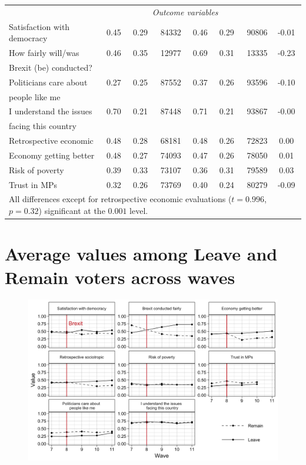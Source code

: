\documentclass[12pt, letter]{article}
\begin{document}
\begin{center}
\begin{longtable}{lrrrrrrc}
  & \multicolumn{6}{c}{\textit{Outcome variables}} \\
  Satisfaction with democracy & 0.45 & 0.29 & 84332 & 0.46 & 0.29 & 90806 & -0.01 \\  
  How fairly will/was  & 0.46 & 0.35 & 12977 & 0.69 & 0.31 & 13335 & -0.23 \\ 
  Brexit (be) conducted? & & & & & & &\\
  Politicians care about & 0.27 & 0.25 & 87552 & 0.37 & 0.26 & 93596 & -0.10 \\ 
  people like me & & & & & & & \\
  I understand the issues & 0.70 & 0.21 & 87448 & 0.71 & 0.21 & 93867 & -0.00 \\ 
  facing this country & & & & & & & \\ 
  Retrospective economic & 0.48 & 0.28 & 68181 & 0.48 & 0.26 & 72823 & 0.00 \\ 
  Economy getting better & 0.48 & 0.27 & 74093 & 0.47 & 0.26 & 78050 & 0.01 \\
  Risk of poverty & 0.39 & 0.33 & 73107 & 0.36 & 0.31 & 79589 & 0.03 \\ 
  Trust in MPs & 0.32 & 0.26 & 73769 & 0.40 & 0.24 & 80279 & -0.09 \\  
\toprule[1.5pt]
\multicolumn{8}{l}{\scriptsize{All differences except for retrospective economic evaluations ($t = 0.996$, $p = 0.32$) significant at the $0.001$ level.}}
\end{longtable}
\end{center}

\section{Average values among Leave and Remain voters across waves} \label{trendsplot}

\begin{figure}[H]
\includegraphics[scale=0.22]{plot_trends.png}
\end{figure}
\end{document}
